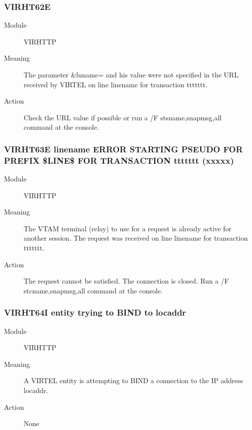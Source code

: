 \documentclass[letterpaper,10pt,english]{sphinxmanual}
\begin{document}
\subsubsection{VIRHT62E}
\label{\detokenize{messages:virht62e}}\begin{description}
\item[{Module}] \leavevmode
VIRHTTP

\item[{Meaning}] \leavevmode
The parameter \&luname= and his value were not specified in the URL received by VIRTEL on line linename for transaction ttttttt.

\item[{Action}] \leavevmode
Check the URL value if possible or run a /F stsname,snapmsg,all command at the console.

\end{description}


\subsubsection{VIRHT63E linename ERROR STARTING PSEUDO FOR PREFIX \$LINE\$ FOR TRANSACTION ttttttt (xxxxx)}
\label{\detokenize{messages:virht63e-linename-error-starting-pseudo-for-prefix-line-for-transaction-ttttttt-xxxxx}}\begin{description}
\item[{Module}] \leavevmode
VIRHTTP

\item[{Meaning}] \leavevmode
The VTAM terminal (relay) to use for a request is already active for another session. The request was received on line linename for transaction ttttttt.

\item[{Action}] \leavevmode
The request cannot be satisfied. The connection is closed. Run a /F stcname,snapmsg,all command at the console.

\end{description}


\subsubsection{VIRHT64I entity trying to BIND to locaddr}
\label{\detokenize{messages:virht64i-entity-trying-to-bind-to-locaddr}}\begin{description}
\item[{Module}] \leavevmode
VIRHTTP

\item[{Meaning}] \leavevmode
A VIRTEL entity is attempting to BIND a connection to the IP address locaddr.

\item[{Action}] \leavevmode
None

\end{description}
\end{document}
